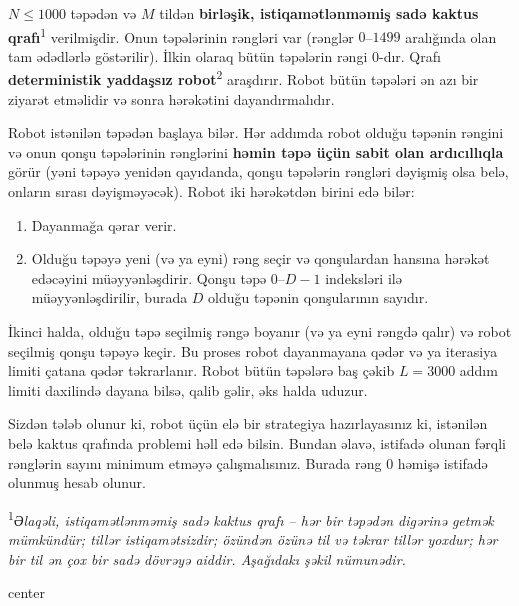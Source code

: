 \documentclass[12pt]{article}
\begin{document}
\renewcommand{\round}{Day 2}
\renewcommand{\problemName}{Naviqasiya}
\renewcommand{\lang}{Azerbaijani}

\renewcommand{\tl}{$3$ san.}
\renewcommand{\ml}{$512$ MB}
\problem{\problemName}

$N \leq 1000$ təpədən və $M$ tildən \textbf{birləşik, istiqamətlənməmiş sadə kaktus qrafı}\textsuperscript{1} verilmişdir. Onun təpələrinin rəngləri var (rənglər $0$–$1499$ aralığında olan tam ədədlərlə göstərilir). İlkin olaraq bütün təpələrin rəngi $0$-dır. Qrafı \textbf{deterministik yaddaşsız robot}\textsuperscript{2} araşdırır. Robot bütün təpələri ən azı bir ziyarət etməlidir və sonra hərəkətini dayandırmalıdır.

Robot istənilən təpədən başlaya bilər. Hər addımda robot olduğu təpənin rəngini və onun qonşu təpələrinin rənglərini \textbf{həmin təpə üçün sabit olan ardıcıllıqla} görür (yəni təpəyə yenidən qayıdanda, qonşu təpələrin rəngləri dəyişmiş olsa belə, onların sırası dəyişməyəcək). Robot iki hərəkətdən birini edə bilər:
\begin{enumerate}
    \item Dayanmağa qərar verir.
    \item Olduğu təpəyə yeni (və ya eyni) rəng seçir və qonşulardan hansına hərəkət edəcəyini müəyyənləşdirir. Qonşu təpə $0$–$D-1$ indeksləri ilə müəyyənləşdirilir, burada $D$ olduğu təpənin qonşularının sayıdır.
\end{enumerate}

İkinci halda, olduğu təpə seçilmiş rəngə boyanır (və ya eyni rəngdə qalır) və robot seçilmiş qonşu təpəyə keçir. Bu proses robot dayanmayana qədər və ya iterasiya limiti çatana qədər təkrarlanır. Robot bütün təpələrə baş çəkib $L = 3000$ addım limiti daxilində dayana bilsə, qalib gəlir, əks halda uduzur.

Sizdən tələb olunur ki, robot üçün elə bir strategiya hazırlayasınız ki, istənilən belə kaktus qrafında problemi həll edə bilsin. Bundan əlavə, istifadə olunan fərqli rənglərin sayını minimum etməyə çalışmalısınız. Burada rəng $0$ həmişə istifadə olunmuş hesab olunur.

\textsuperscript{1}\textit{Əlaqəli, istiqamətlənməmiş sadə kaktus qrafı – hər bir təpədən digərinə getmək mümkündür; tillər istiqamətsizdir; özündən özünə til və təkrar tillər yoxdur; hər bir til ən çox bir sadə dövrəyə aiddir. Aşağıdakı şəkil nümunədir.}

\begin{adjustbox}{center}
	
\end{adjustbox}
\end{document}
